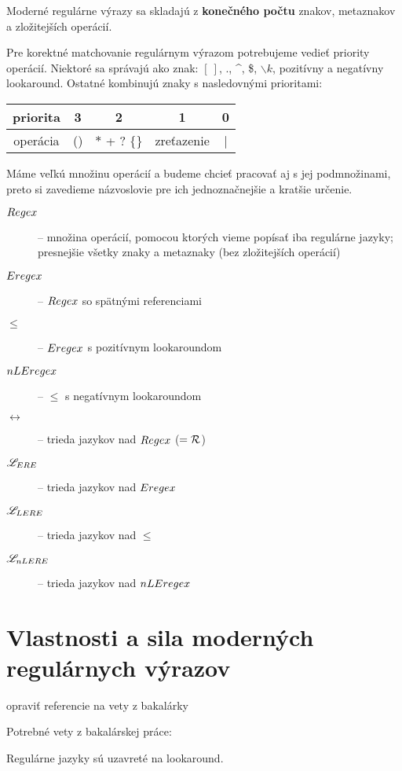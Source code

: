 Moderné regulárne výrazy sa skladajú z \textbf{konečného počtu} znakov, metaznakov a zložitejších operácií.

Pre korektné matchovanie regulárnym výrazom potrebujeme vedieť priority operácií. Niektoré sa správajú ako znak: $\left[~\right]$, ., \textasciicircum, \$, $\backslash k$, pozitívny a negatívny lookaround. Ostatné kombinujú znaky s nasledovnými prioritami:
\begin{center}
\begin{tabular}{|c||c|c|c|c|}
\hline
priorita &3&2&1& 0  \\
\hline
operácia & () & $*$ + ? $\lbrace \rbrace$ & zreťazenie & | \\ \hline
\end{tabular}
\end{center}

Máme veľkú množinu operácií a budeme chcieť pracovať aj s jej podmnožinami, preto si zavedieme názvoslovie pre ich jednoznačnejšie a kratšie určenie.

\begin{description}
\item[$Regex$] -- množina operácií, pomocou ktorých vieme popísať iba regulárne jazyky; presnejšie všetky znaky a metaznaky (bez zložitejších operácií)
\item[$Eregex$] -- $Regex$ so spätnými referenciami
\item[$\le$] -- $Eregex$ s pozitívnym lookaroundom
\item[$nLEregex$] -- $\le$ s negatívnym lookaroundom
\item[$\rel$] -- trieda jazykov nad $Regex$ ($= {\cal R}$)
\item[$\mathscr{L}_{ERE}$] -- trieda jazykov nad $Eregex$
\item[$\mathscr{L}_{LERE}$] -- trieda jazykov nad $\le$
\item[$\mathscr{L}_{nLERE}$] -- trieda jazykov nad $nLEregex$
\end{description}

\section[Vlastnosti a sila]{Vlastnosti a sila moderných regulárnych výrazov}
\label{usila}

\todo opraviť referencie na vety z bakalárky

Potrebné vety z bakalárskej práce:

\begin{veta}[Veta 2.2.5.]\label{lookahead+R}
Regulárne jazyky sú uzavreté na lookaround.
\end{veta}

